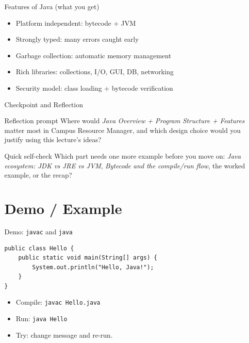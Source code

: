 \documentclass{beamer}
\begin{document}
\begin{frame}{Features of Java (what you get)}
  \begin{itemize}[<+->]
    \item Platform independent: bytecode + JVM
    \item Strongly typed: many errors caught early
    \item Garbage collection: automatic memory management
    \item Rich libraries: collections, I/O, GUI, DB, networking
    \item Security model: class loading + bytecode verification
  \end{itemize}
  \slidesources{\OOPSUnitISources}
\end{frame}

\begin{frame}{Checkpoint and Reflection}
\begin{block}{Reflection prompt}
Where would \textit{Java Overview + Program Structure + Features} matter most in Campus Resource Manager, and which design choice would you justify using this lecture's ideas?
\end{block}
\begin{block}{Quick self-check}
Which part needs one more example before you move on: \textit{Java ecosystem: JDK vs JRE vs JVM}, \textit{Bytecode and the compile/run flow}, the worked example, or the recap?
\end{block}
  \slidesources{\OOPSUnitISources}
\end{frame}

\section{Demo / Example}
\label{sec:demo}

\begin{frame}[fragile]{Demo: \texttt{javac} and \texttt{java}}
\begin{lstlisting}
public class Hello {
    public static void main(String[] args) {
        System.out.println("Hello, Java!");
    }
}
\end{lstlisting}
  \vspace{0.4em}
  \begin{itemize}[<+->]
    \item Compile: \texttt{javac Hello.java}
    \item Run: \texttt{java Hello}
    \item Try: change message and re-run.
  \end{itemize}
  \slidesources{\OOPSUnitISources}
\end{frame}
\end{document}
